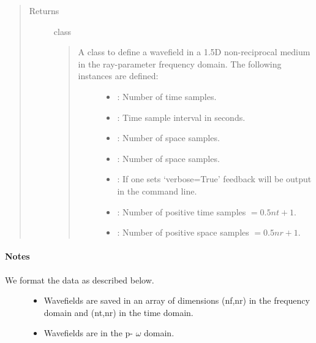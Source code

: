 \documentclass[letterpaper,10pt,english]{sphinxmanual}
\begin{document}
\begin{fulllineitems}
\begin{quote}
\begin{description}
\item[{Returns}] \leavevmode
class
\begin{quote}
\begin{description}
\item[{A class to define a wavefield in a 1.5D non-reciprocal medium in the ray-parameter frequency domain. The following instances are defined:}] \leavevmode\begin{itemize}
\item {} 
: Number of time samples.

\item {} 
: Time sample interval in seconds.

\item {} 
: Number of space samples.

\item {} 
: Number of space samples.

\item {} 
: If one sets ‘verbose=True’ feedback will be output in the command line.

\item {} 
: Number of positive time samples \(=0.5 nt + 1\).

\item {} 
: Number of positive space samples \(=0.5 nr + 1\).

\end{itemize}

\end{description}
\end{quote}

\end{description}\end{quote}
\paragraph{Notes}
\begin{description}
\item[{We format the data as described below.}] \leavevmode\begin{itemize}
\item {} 
Wavefields are saved in an array of dimensions (nf,nr) in the frequency domain and (nt,nr) in the time domain.

\item {} 
Wavefields are in the p- \(\omega\) domain.


\end{itemize}
\end{description}
\end{fulllineitems}
\end{document}
